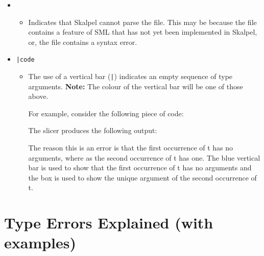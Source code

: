 \documentclass{report}
\begin{document}
\begin{itemize}
\item \texttt{}

\begin{itemize}
\item Indicates that Skalpel cannot parse the file. This
  may be because the file contains a feature of SML that has not yet
  been implemented in Skalpel, or, the file contains a
  syntax error.
\end{itemize}

\item \texttt{|\hspace{-0.03in}code}

\begin{itemize}
\item The use of a vertical bar (\texttt{|}) indicates an empty sequence of type
  arguments. \textbf{Note:} The colour of the vertical bar will be one of those
  above.

  For example, consider the following piece of code:


  The slicer produces the following output:


  The reason this is an error is that the first occurrence of t has no
  arguments, where as the second occurrence of t has one. The blue
  vertical bar is used to show that the first occurrence of t has no arguments
  and the \tesEndPointOne box is used to show the unique argument of the second
  occurrence of t.
\end{itemize}

\end{itemize}

\newpage

\section{Type Errors Explained (with examples)}
\end{document}
